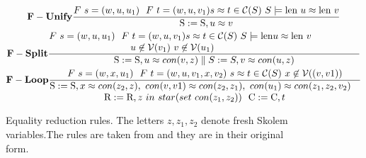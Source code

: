 \begin{figure}
\begin{minipage}{1.0\textwidth}
\scriptsize
\begin{gather*}\label{eA1}
 \bold{F-Unify} \frac
 { F \ s = ( w,u,u_1) \ \ F \ t = (w, u,v_1)  s\approx t \in \mathcal{C}(S) \ S \models \textnormal{len} \ u \approx \textnormal{len} \ v }
 { \textnormal{S}:= \textnormal{S}, u \approx v}\\
  \bold{F-Split} \frac
  {\parbox{4.5in}{$  F \ s = ( w,u,u_1) \ \ F \ t = (w, u,v_1)  s\approx t \in \mathcal{C}(S) \ S \models \textnormal{len} u \approx \textnormal{len} \ v  $ \\
       \hspace*{3.0cm}$ u \not\in \mathcal{V}(v_1) \ v \not\in \mathcal{V}(u_1)$}}
  { \textnormal{S}:= \textnormal{S}, u \approx con(v, z) \parallel  S:= S, v \approx con(u, z) }\\
  \bold{F-Loop} \frac
  { F \ s = ( w,x,u_1) \ \ F \ t = (w, u,v_1, x, v_2)  \ s\approx t \in \mathcal{C}(S) \ x \not\in \mathcal{V}((v,v1))}
  { \parbox{4.5in}{$ \textnormal{S}:= \textnormal{S}, x \approx con(z_2, z),\ con(v,v1) \approx con(z_2,z_1),\ con(u_1) \approx con( z_1, z_2,v_2)$ \\
   \hspace*{2.0cm}$  \textnormal{R}:=\textnormal{R}, z \ in \ star(set \ con(z_1, z_2)) \ \ \textnormal{C}:=\textnormal{C}, t $}}
\end{gather*}
\null
\par\xdef\tpd{\the\prevdepth}
\end{minipage}
\caption{Equality reduction rules. The letters \(z, z_1, z_2\) denote fresh Skolem variables.The rules are taken from \cite{main-paper} and they are in their original form.}
\label{rules_4}
\end{figure}